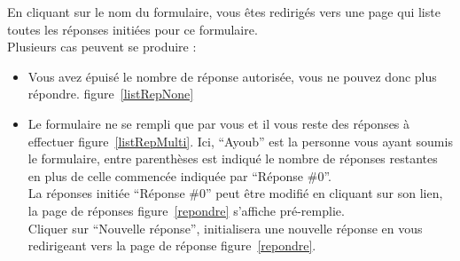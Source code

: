\documentclass[a4paper,11pt,final]{report}
\begin{document}
En cliquant sur le nom du formulaire, vous êtes redirigés vers une page qui liste toutes les réponses initiées pour ce formulaire.\\
Plusieurs cas peuvent se produire :
\begin{itemize}
	\item Vous avez épuisé le nombre de réponse autorisée, vous ne pouvez donc plus répondre. figure~\ref{listRepNone}
	
\noindent\begin{minipage}{\linewidth}%
\label{listRepNone}
\end{minipage}

	\item Le formulaire ne se rempli que par vous et il vous reste des réponses à effectuer figure~\ref{listRepMulti}. Ici, ``Ayoub'' est la personne vous ayant soumis le formulaire, entre parenthèses est indiqué le nombre de réponses restantes en plus de celle commencée indiquée par ``Réponse \#0''.\\
	La réponses initiée ``Réponse \#0'' peut être modifié en cliquant sur son lien, la page de réponses figure~\ref{repondre} s'affiche pré-remplie.\\
	Cliquer sur ``Nouvelle réponse'', initialisera une nouvelle réponse en vous redirigeant vers la page de réponse figure~\ref{repondre}.
	
	\noindent\begin{minipage}{\linewidth}%
\label{listRepMulti}
\end{minipage}


\end{itemize}
\end{document}
